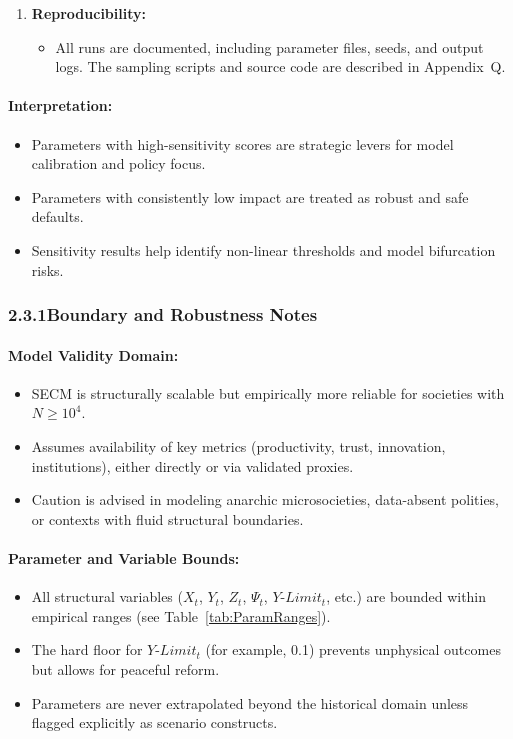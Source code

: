 \documentclass[12pt]{report}
\begin{document}
\begin{enumerate}
  \item \textbf{Reproducibility:}
  \begin{itemize}
    \item All runs are documented, including parameter files, seeds, and output logs. The sampling scripts and source code are described in Appendix~Q.
  \end{itemize}
\end{enumerate}

\paragraph{Interpretation:}
\begin{itemize}
  \item Parameters with high-sensitivity scores are strategic levers for model calibration and policy focus.
  \item Parameters with consistently low impact are treated as robust and safe defaults.
  \item Sensitivity results help identify non-linear thresholds and model bifurcation risks.
\end{itemize}

\vspace{0.5em}
\subsubsection*{2.3.1\quad Boundary and Robustness Notes}

\paragraph{Model Validity Domain:}
\begin{itemize}
  \item SECM is structurally scalable but empirically more reliable for societies with $N \geq 10^4$.
  \item Assumes availability of key metrics (productivity, trust, innovation, institutions), either directly or via validated proxies.
  \item Caution is advised in modeling anarchic microsocieties, data-absent polities, or contexts with fluid structural boundaries.
\end{itemize}

\paragraph{Parameter and Variable Bounds:}
\begin{itemize}
  \item All structural variables ($X_t$, $Y_t$, $Z_t$, $\Psi_t$, $Y\text{-}Limit_t$, etc.) are bounded within empirical ranges (see Table~\ref{tab:ParamRanges}).
  \item The hard floor for $Y\text{-}Limit_t$ (for example, 0.1) prevents unphysical outcomes but allows for peaceful reform.
  \item Parameters are never extrapolated beyond the historical domain unless flagged explicitly as scenario constructs.
\end{itemize}
\end{document}
